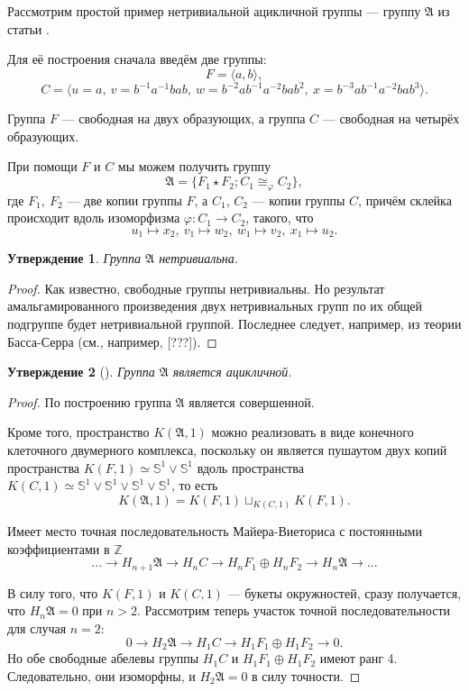 \documentclass[14pt, dvipsnames]{extarticle}
\newtheorem{statement}{Утверждение}
\theoremstyle{definition}
\theoremstyle{remark}
\begin{document}
Рассмотрим простой пример нетривиальной ацикличной группы --- группу $\mathfrak{A}$ из статьи \cite{BDH}.

Для её построения сначала введём две группы: $$F=\langle a, b \rangle,$$ $$C=\langle u=a,\ v=b^{-1}a^{-1}bab,\ w=b^{-2}ab^{-1}a^{-2}bab^2,\ x= b^{-3}ab^{-1}a^{-2}bab^3 \rangle.$$

Группа $F$ --- свободная на двух образующих, а группа $C$ --- свободная на четырёх образующих.

При помощи $F$ и $C$ мы можем получить группу $$\mathfrak{A}=\{ F_1\star F_2; C_1\cong_\varphi C_2\},$$ где $F_1, \ F_2$ --- две копии группы $F$, а $C_1$, $C_2$ --- копии группы $C$, причём склейка происходит вдоль изоморфизма $\varphi: C_1\to C_2$, такого, что $$u_1\mapsto x_2,\ v_1\mapsto w_2,\ w_1\mapsto v_2,\ x_1\mapsto u_2.$$ 

\begin{statement}
Группа $\mathfrak{A}$ нетривиальна.
\end{statement} 

\begin{proof}
Как известно, свободные группы нетривиальны. Но результат амальгамированного произведения двух нетривиальных групп по их общей подгруппе будет нетривиальной группой. Последнее следует, например, из теории Басса-Серра (см., например, [???]).
\end{proof}

\begin{statement}[\cite{BDH}] 
Группа $\mathfrak{A}$ является ацикличной.
\end{statement}

\begin{proof}

По построению группа $\mathfrak{A}$ является совершенной.

Кроме того, пространство $K(\mathfrak{A}, 1)$ можно реализовать в виде конечного клеточного двумерного комплекса, поскольку он является пушаутом двух копий  пространства $K(F, 1)\simeq \mathbb{S}^1\vee \mathbb{S}^1$ вдоль пространства $K(C, 1)\simeq \mathbb{S}^1\vee\mathbb{S}^1\vee\mathbb{S}^1\vee\mathbb{S}^1$, то есть $$K(\mathfrak{A}, 1)=K(F, 1)\sqcup_{K(C, 1)} K(F, 1).$$ 

Имеет место точная последовательность Майера-Виеториса с постоянными коэффициентами в $\mathbb{Z}$ 
$$...\to H_{n+1}\mathfrak{A}\to H_nC\to H_nF_1\oplus H_n F_2\to H_n\mathfrak{A}\to ...$$

В силу того, что $K(F, 1)$ и $K(C, 1)$ --- букеты окружностей, сразу получается, что $H_n\mathfrak{A}=0$ при $n>2$. Рассмотрим теперь участок точной последовательности для случая $n=2$: 
$$0\to H_2\mathfrak{A}\to H_1C\to H_1F_1\oplus H_1F_2\to 0.$$ Но обе свободные абелевы группы $H_1C$ и $H_1F_1\oplus H_1 F_2$ имеют ранг 4. Следовательно, они изоморфны, и $H_2\mathfrak{A}=0$ в силу точности.


\end{proof}
\end{document}
